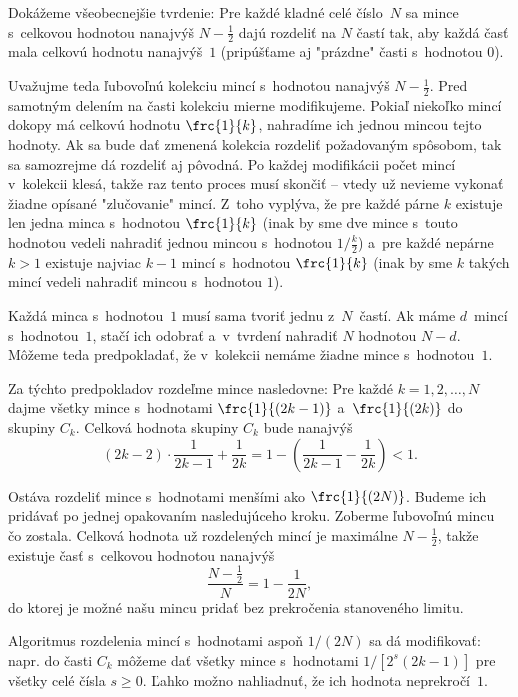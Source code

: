 {%
Dokážeme všeobecnejšie tvrdenie: Pre každé kladné celé číslo~$N$ sa mince s~celkovou hodnotou nanajvýš $N-\frac{1}{2}$ dajú rozdeliť na $N$ častí tak, aby každá časť mala celkovú hodnotu nanajvýš~$1$ (pripúšťame aj "prázdne" časti s~hodnotou $0$).

Uvažujme teda ľubovoľnú kolekciu mincí s~hodnotou nanajvýš $N-\frac{1}{2}$. Pred samotným delením na časti kolekciu mierne modifikujeme. Pokiaľ niekoľko mincí dokopy má celkovú hodnotu $\frc{1}{k}$, nahradíme ich jednou mincou tejto hodnoty. Ak sa bude dať zmenená kolekcia rozdeliť požadovaným spôsobom, tak sa samozrejme dá rozdeliť aj pôvodná. Po každej modifikácii počet mincí v~kolekcii klesá, takže raz tento proces musí skončiť -- vtedy už nevieme vykonať žiadne opísané "zlučovanie" mincí. Z~toho vyplýva, že pre každé párne $k$ existuje len jedna minca s~hodnotou $\frc{1}{k}$ (inak by sme dve mince s~touto hodnotou vedeli nahradiť jednou mincou s~hodnotou $1/\frac k2$) a~pre každé nepárne $k>1$ existuje najviac $k-1$ mincí s~hodnotou $\frc{1}{k}$ (inak by sme $k$ takých mincí vedeli nahradiť mincou s~hodnotou $1$).

Každá minca s~hodnotou~$1$ musí sama tvoriť jednu z~$N$~častí. Ak máme $d$~mincí s~hodnotou~$1$, stačí ich odobrať a~v~tvrdení nahradiť $N$ hodnotou $N-d$. Môžeme teda predpokladať, že v~kolekcii nemáme žiadne mince s~hodnotou~$1$.

Za týchto predpokladov rozdeľme mince nasledovne: Pre každé $k = 1, 2, \dots, N$ dajme všetky mince s~hodnotami $\frc{1}{(2k-1)}$ a~$\frc{1}{(2k)}$ do skupiny $C_k$. Celková hodnota skupiny $C_k$ bude nanajvýš
$$
(2k-2)\cdot \frac{1}{2k-1} + \frac{1}{2k} = 1 - \left(\frac{1}{2k-1} - \frac{1}{2k}\right) < 1.
$$

Ostáva rozdeliť mince s~hodnotami menšími ako $\frc{1}{(2N)}$. Budeme ich pridávať po jednej opakovaním nasledujúceho kroku. Zoberme ľubovoľnú mincu čo zostala. Celková hodnota už rozdelených mincí je maximálne $N - \frac{1}{2}$, takže existuje časť s~celkovou hodnotou nanajvýš
$$
\frac{N - \frac{1}{2}}N = 1 - \frac{1}{2N},
$$
do ktorej je možné našu mincu pridať bez prekročenia stanoveného limitu.

\poznamka
Algoritmus rozdelenia mincí s~hodnotami aspoň $1/(2N)$ sa dá modifikovať: napr. do časti $C_k$ môžeme dať všetky mince s~hodnotami $1/[2^s(2k-1)]$ pre všetky celé čísla $s\ge0$. Ľahko možno nahliadnuť, že ich hodnota neprekročí~$1$.
}

